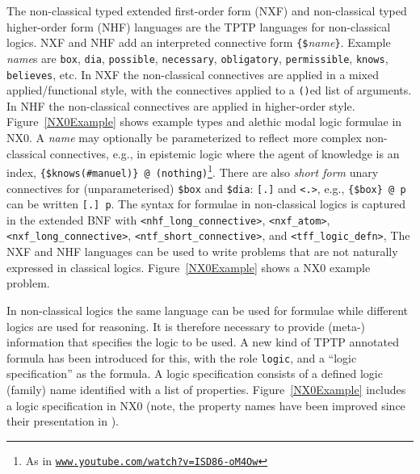 \documentclass[runningheads]{llncs}
\begin{document}
The non-classical typed extended first-order form (NXF) and non-classical typed higher-order 
form (NHF) languages are the TPTP languages for non-classical logics.
NXF and NHF add an interpreted connective form
{\tt \verb|{|\$}{\em name}{\tt \verb|}|}.
Example {\em name}s are {\tt box}, {\tt dia}, {\tt possible}, {\tt necessary},
{\tt obligatory}, {\tt permissible}, {\tt knows}, {\tt believes}, etc.
In NXF the non-classical connectives are applied in a mixed applied/functional style, with the 
connectives applied to a {\tt ()}ed list of arguments.
In NHF the non-classical connectives are applied in higher-order style.
Figure~\ref{NX0Example} shows example types and alethic modal logic formulae in NX0.
A {\em name} may optionally be parameterized to reflect more complex non-classical connectives, 
e.g., in epistemic logic where the agent of knowledge is an index,
{\tt \verb|{|\$knows(\#manuel)\verb|}| @ (nothing)}\footnote{%
As in 
\href{https://www.youtube.com/watch?v=ISD86-oM4Ow}{\tt www.youtube.com/watch?v=ISD86-oM4Ow}}.
There are also {\em short form} unary connectives for (unparameterised) {\tt \$box} and 
{\tt \$dia}: {\tt [.]} and {\tt <.>}, e.g., {\tt \verb|{|\$box\verb|}| @ p} can be written 
{\tt [.] p}.
The syntax for formulae in non-classical logics is captured in the extended BNF with
{\tt <nhf\_long\_conn\-ective>}, {\tt <nxf\_atom>}, {\tt <nxf\_long\_conn\-ective>},
{\tt <ntf\_short\_conn\-ective>}, and {\tt <tff\_logic\_defn>},
The NXF and NHF languages can be used to write problems that are not naturally expressed in
classical logics.
Figure~\ref{NX0Example} shows a NX0 example problem.

In non-classical logics the same language can be used for formulae while different logics are 
used for reasoning.
It is therefore necessary to provide \mbox{(meta-)} information that specifies the
logic to be used.
A new kind of TPTP annotated formula has been introduced for this, with the role \texttt{logic},
and a ``logic specification'' as the formula.
A logic specification consists of a defined logic (family) name identified with a list of 
properties.
Figure~\ref{NX0Example} includes a logic specification in NX0 (note, the property names have
been improved since their presentation in \cite{SF+22}).
\end{document}
